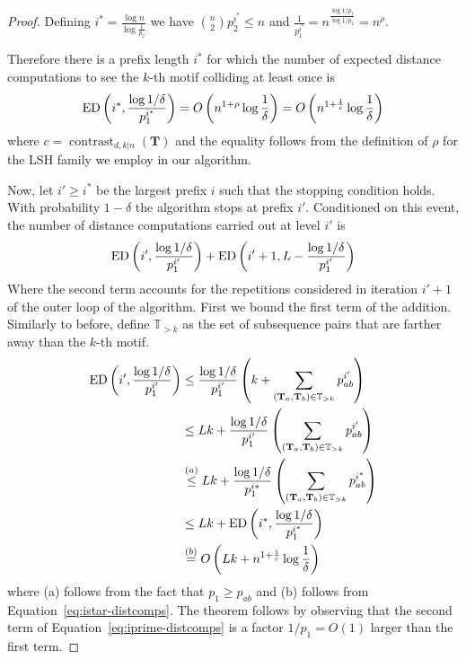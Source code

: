 \begin{proof}
Defining
$i^* = \frac{\log n}{\log\frac{1}{p_2}}$
we have
${n \choose 2} p_2^{i^*} \le n$
and
$\frac{1}{p_1^{i^*}} =n^{\frac{\log 1/p_1}{\log 1/p_2}} = n^\rho$.

Therefore there is a prefix length $i^*$ for which the number of expected distance computations
to see the $k$-th motif colliding at least once is
\begin{equation}\label{eq:istar-distcomps}
\operatorname{ED}\left(i^*, \frac{\log 1/\delta}{p_1^{i^*}}\right)
=
O\left( n^{1+\rho}\log\frac{1}{\delta} \right)
=
O\left( n^{1+\frac{1}{c}}\log\frac{1}{\delta} \right)
\end{equation}
where $c = \operatorname{contrast}_{d,k|n}(\mathbf{T})$ and the equality follows
from the definition of $\rho$ for the LSH family we employ in our algorithm.

Now, let $i' \ge i^*$ be the largest prefix $i$ such that the stopping condition holds.
With probability $1-\delta$ the algorithm stops at prefix $i'$.
Conditioned on this event, the number of distance computations carried out at level $i'$ is
\begin{equation}\label{eq:iprime-distcomps}
\operatorname{ED}\left(i', \frac{\log 1/\delta}{p_1^{i'}}\right)
+
\operatorname{ED}\left(i'+1, L-\frac{\log 1/\delta}{p_1^{i'}}\right)
\end{equation}
Where the second term accounts for the repetitions considered in iteration $i'+1$ of the outer loop of the algorithm.
First we bound the first term of the addition.
Similarly to before, define $\mathbb{T}_{>k}$ as the set of subsequence pairs that are farther away than the $k$-th motif.
\begin{equation}
\label{eq:boundingi*}
\begin{aligned}
\operatorname{ED}\left(i', \frac{\log 1/\delta}{p_1^{i'}}\right)
&\le\frac{\log 1/\delta}{p_1^{i'}}\left(
    k + \sum_{(\mathbf{T}_{a}, \mathbf{T}_{b})\in\mathbb{T}_{>k}} p_{ab}^{i'}
    \right)\\
&\le
    Lk
    +
    \frac{\log 1/\delta}{p_1^{i'}}\left(
    \sum_{(\mathbf{T}_{a}, \mathbf{T}_{b})\in\mathbb{T}_{>k}} p_{ab}^{i'}
    \right)\\
&\stackrel{(a)}{\le}
    Lk
    +
    \frac{\log 1/\delta}{p_1^{i*}}\left(
    \sum_{(\mathbf{T}_{a}, \mathbf{T}_{b})\in\mathbb{T}_{>k}} p_{ab}^{i^*}
    \right)\\
&\le
    Lk + \operatorname{ED}\left(i^*, \frac{\log 1/\delta}{p_1^{i^*}}\right)\\
&\stackrel{(b)}{=}
    O\left(
        Lk + n^{1+\frac{1}{c}} \log \frac{1}{\delta}
    \right)
\end{aligned}
\end{equation}
where (a) follows from the fact that $p_1 \ge p_{ab}$
and (b) follows from Equation~\eqref{eq:istar-distcomps}.
The theorem follows by observing that the second term of Equation~\eqref{eq:iprime-distcomps} is a factor $1/p_1 = O(1)$ larger than the first term.
\end{proof}


